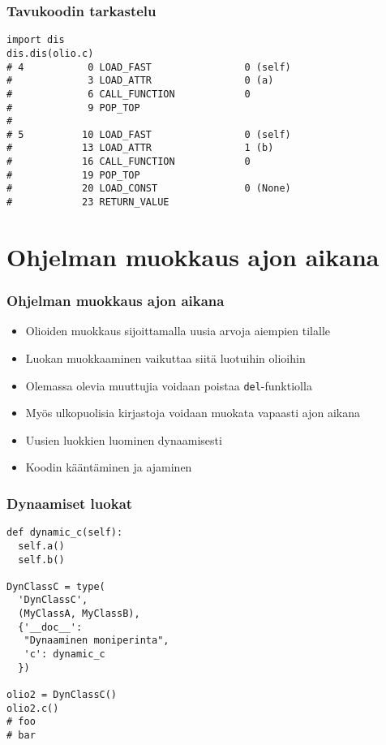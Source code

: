 \documentclass{beamer}
\begin{document}
\begin{frame}[fragile]
\frametitle{Tavukoodin tarkastelu}
\begin{verbatim}
import dis
dis.dis(olio.c)
# 4           0 LOAD_FAST                0 (self)
#             3 LOAD_ATTR                0 (a)
#             6 CALL_FUNCTION            0
#             9 POP_TOP             
#
# 5          10 LOAD_FAST                0 (self)
#            13 LOAD_ATTR                1 (b)
#            16 CALL_FUNCTION            0
#            19 POP_TOP             
#            20 LOAD_CONST               0 (None)
#            23 RETURN_VALUE        
\end{verbatim}
\end{frame}


\section{Ohjelman muokkaus ajon aikana}


\begin{frame}[fragile]
\frametitle{Ohjelman muokkaus ajon aikana}
\begin{itemize}
\item{Olioiden muokkaus sijoittamalla uusia arvoja aiempien tilalle}
\item{Luokan muokkaaminen vaikuttaa siitä luotuihin olioihin}
\item{Olemassa olevia muuttujia voidaan poistaa \verb|del|-funktiolla}
\item{Myös ulkopuolisia kirjastoja voidaan muokata vapaasti ajon aikana}
\item{Uusien luokkien luominen dynaamisesti}
\item{Koodin kääntäminen ja ajaminen}
\end{itemize}
\end{frame}


\begin{frame}[fragile]
\frametitle{Dynaamiset luokat}
\begin{verbatim}
def dynamic_c(self):
  self.a()
  self.b()

DynClassC = type(
  'DynClassC', 
  (MyClassA, MyClassB), 
  {'__doc__': 
   "Dynaaminen moniperinta", 
   'c': dynamic_c
  })

olio2 = DynClassC()
olio2.c()
# foo    
# bar
\end{verbatim}
\end{frame}

\end{document}
